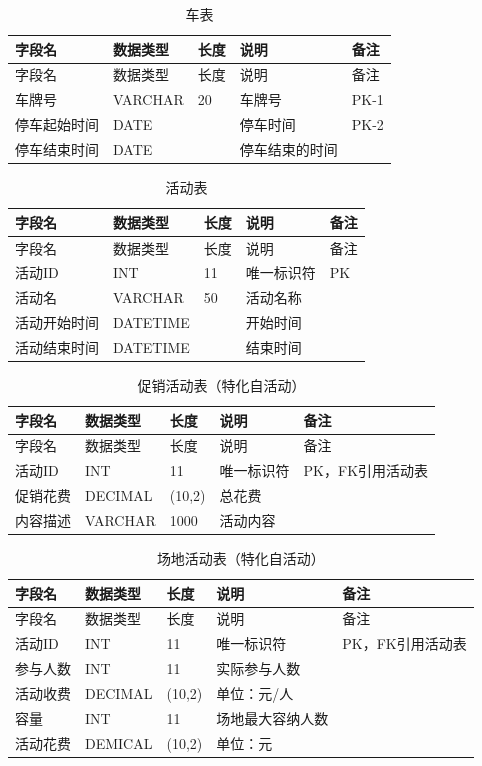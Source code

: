 \documentclass[]{article}
\begin{document}
\begin{longtable}[]{@{}lllll@{}}
\caption{车表}\\
\toprule
字段名 & 数据类型 & 长度 & 说明 & 备注 \\
\midrule
\endfirsthead
\toprule
字段名 & 数据类型 & 长度 & 说明 & 备注 \\
\midrule
\endhead
车牌号 & VARCHAR & 20 & 车牌号 & PK-1 \\
停车起始时间 & DATE &  & 停车时间 & PK-2 \\
停车结束时间 & DATE &  & 停车结束的时间 & \\
\bottomrule
\end{longtable}

\begin{longtable}[]{@{}lllll@{}}
\caption{活动表}\\
\toprule
字段名 & 数据类型 & 长度 & 说明 & 备注 \\
\midrule
\endfirsthead
\toprule
字段名 & 数据类型 & 长度 & 说明 & 备注 \\
\midrule
\endhead
活动ID & INT & 11 & 唯一标识符 & PK \\
活动名 & VARCHAR & 50 & 活动名称 & \\
活动开始时间 & DATETIME &  & 开始时间 & \\
活动结束时间 & DATETIME &  & 结束时间 & \\
\bottomrule
\end{longtable}

\begin{longtable}[]{@{}lllll@{}}
\caption{促销活动表（特化自活动）}\\
\toprule
字段名 & 数据类型 & 长度 & 说明 & 备注 \\
\midrule
\endfirsthead
\toprule
字段名 & 数据类型 & 长度 & 说明 & 备注 \\
\midrule
\endhead
活动ID & INT & 11 & 唯一标识符 & PK，FK引用活动表 \\
促销花费 & DECIMAL & (10,2) & 总花费 & \\
内容描述 & VARCHAR & 1000 & 活动内容 & \\
\bottomrule
\end{longtable}

\begin{longtable}[]{@{}lllll@{}}
\caption{场地活动表（特化自活动）}\\
\toprule
字段名 & 数据类型 & 长度 & 说明 & 备注 \\
\midrule
\endfirsthead
\toprule
字段名 & 数据类型 & 长度 & 说明 & 备注 \\
\midrule
\endhead
活动ID & INT & 11 & 唯一标识符 & PK，FK引用活动表 \\
参与人数 & INT & 11 & 实际参与人数 & \\
活动收费 & DECIMAL & (10,2) & 单位：元/人 & \\
容量 & INT & 11 & 场地最大容纳人数 & \\
活动花费 & DEMICAL & (10,2) & 单位：元 & \\
\bottomrule
\end{longtable}
\end{document}
